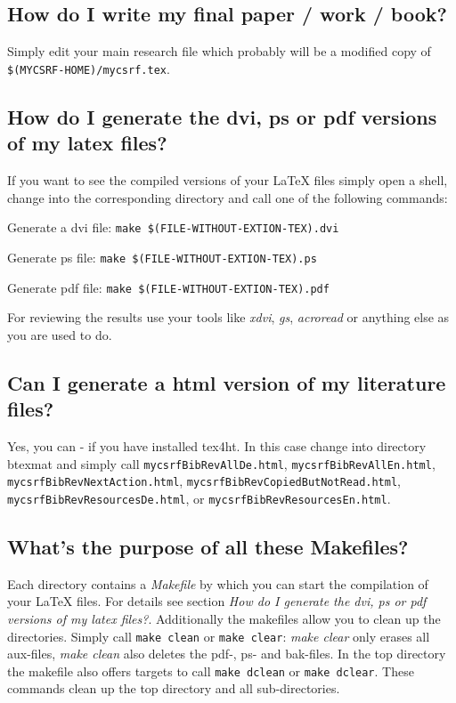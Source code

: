 \documentclass[
  DIV=calc,
  BCOR=5mm,
  11pt,
  headings=small,
  oneside,
  abstract=true,
  toc=bib,
  ngerman,english]{scrartcl}
\begin{document}
\subsection{How do I write my final paper / work / book?}

Simply edit your main research file which probably will be a modified copy of
\texttt{\$(MYCSRF-HOME)/mycsrf.tex}. 

\subsection{How do I generate the dvi, ps or pdf versions of my latex files?}
If you want to see the compiled versions of your LaTeX files simply open a
shell, change into the corresponding directory and call one of the following
commands:

\begin{description} 
\item Generate a dvi file: \texttt{make \$(FILE-WITHOUT-EXTION-TEX).dvi}
\item Generate ps file: \texttt{make \$(FILE-WITHOUT-EXTION-TEX).ps} 
\item Generate pdf file: \texttt{make \$(FILE-WITHOUT-EXTION-TEX).pdf}
\end{description}

For reviewing the results use your tools like \textit{xdvi}, \textit{gs},
\textit{acroread} or anything else as you are used to do.

\subsection{Can I generate a html version of my literature files?}
Yes, you can - if you have installed tex4ht. In this case change into
directory btexmat and simply call \texttt{mycsrfBibRevAllDe.html}, 
\texttt{mycsrfBibRevAllEn.html}, \texttt{mycsrfBibRevNextAction.html},
\texttt{mycsrfBibRevCopiedButNotRead.html},
\texttt{mycsrfBibRevResourcesDe.html}, or
\texttt{mycsrfBibRevResourcesEn.html}.

\subsection{What's the purpose of all these Makefiles?}
Each directory contains a \textit{Makefile} by which you can start the
compilation of your LaTeX files. For details see section \textit{How do I
generate the dvi, ps or pdf versions of my latex files?}. Additionally the
makefiles allow you to clean up the directories. Simply call \texttt{make clean}
or \texttt{make clear}: \textit{make clear} only erases all aux-files,
\textit{make clean} also deletes the pdf-, ps- and bak-files. In the top
directory the makefile also offers targets to call \texttt{make
dclean} or \texttt{make dclear}. These commands clean up the top directory and
all sub-directories.
\end{document}
